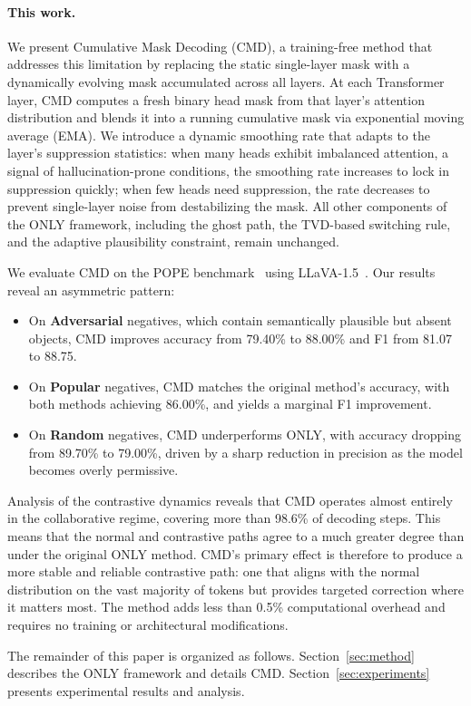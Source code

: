 \paragraph{This work.}
We present Cumulative Mask Decoding (CMD), a training-free method that addresses this limitation by replacing the static single-layer mask with a dynamically evolving mask accumulated across all layers. At each Transformer layer, CMD computes a fresh binary head mask from that layer's attention distribution and blends it into a running cumulative mask via exponential moving average (EMA). We introduce a dynamic smoothing rate that adapts to the layer's suppression statistics: when many heads exhibit imbalanced attention, a signal of hallucination-prone conditions, the smoothing rate increases to lock in suppression quickly; when few heads need suppression, the rate decreases to prevent single-layer noise from destabilizing the mask. All other components of the ONLY framework, including the ghost path, the TVD-based switching rule, and the adaptive plausibility constraint, remain unchanged.

We evaluate CMD on the POPE benchmark~\cite{li2023pope} using LLaVA-1.5~\cite{liu2024visual}. Our results reveal an asymmetric pattern:
\begin{itemize}
    \item On \textbf{Adversarial} negatives, which contain semantically plausible but absent objects, CMD improves accuracy from 79.40\% to 88.00\% and F1 from 81.07 to 88.75.
    \item On \textbf{Popular} negatives, CMD matches the original method's accuracy, with both methods achieving 86.00\%, and yields a marginal F1 improvement.
    \item On \textbf{Random} negatives, CMD underperforms ONLY, with accuracy dropping from 89.70\% to 79.00\%, driven by a sharp reduction in precision as the model becomes overly permissive.
\end{itemize}

Analysis of the contrastive dynamics reveals that CMD operates almost entirely in the collaborative regime, covering more than 98.6\% of decoding steps. This means that the normal and contrastive paths agree to a much greater degree than under the original ONLY method. CMD's primary effect is therefore to produce a more stable and reliable contrastive path: one that aligns with the normal distribution on the vast majority of tokens but provides targeted correction where it matters most. The method adds less than 0.5\% computational overhead and requires no training or architectural modifications.

The remainder of this paper is organized as follows. Section~\ref{sec:method} describes the ONLY framework and details CMD. Section~\ref{sec:experiments} presents experimental results and analysis.
